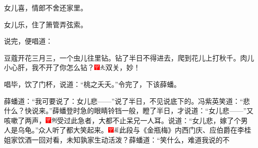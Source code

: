女儿喜，情郎不舍还家里。

女儿乐，住了箫管弄弦索。

说完，便唱道：

豆蔻开花三月三，一个虫儿往里钻。钻了半日不得进去，爬到花儿上打秋千。肉儿小心肝，我不开了你怎么钻？{\includegraphics[width=3mm]{../Images/00002}\includegraphics[width=3mm]{../Images/00012}\footnotesize \kaishu 双关，妙！}

唱毕，饮了门杯，说道：``桃之夭夭。''令完了，下该薛蟠。

薛蟠道：``我可要说了：女儿悲------''说了半日，不见说底下的。冯紫英笑道：``悲什么？快说来。''薛蟠登时急的眼睛铃铛一般，瞪了半日，才说道：``女儿悲------''又咳嗽了两声，{\includegraphics[width=3mm]{../Images/00002}\includegraphics[width=3mm]{../Images/00011}\footnotesize \kaishu 受过此急者，大都不止呆兄一人耳。}说道：``女儿悲，嫁了个男人是乌龟。''众人听了都大笑起来。{\includegraphics[width=3mm]{../Images/00002}\includegraphics[width=3mm]{../Images/00010}\footnotesize \kaishu 此段与《金瓶梅》内西门庆、应伯爵在李桂姐家饮酒一回对看，未知孰家生动活泼？}薛蟠道：``笑什么，难道我说的不